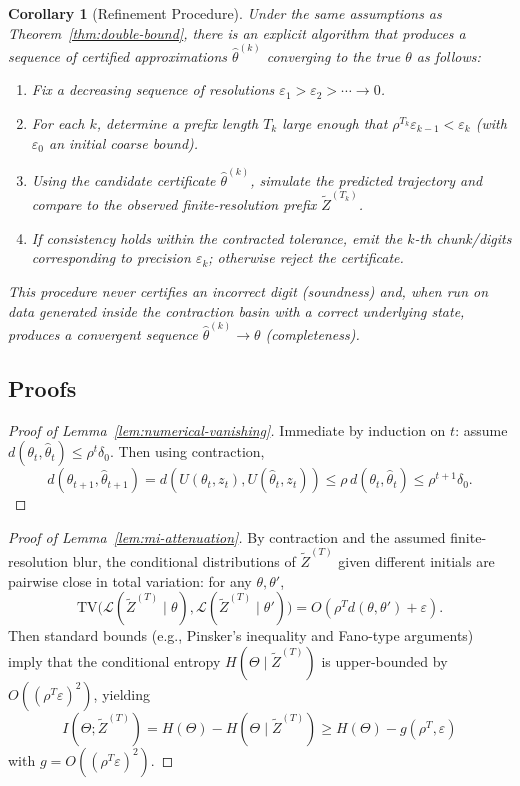 \documentclass[12pt]{article}
\theoremstyle{definition}
\theoremstyle{plain}
\newtheorem{corollary}{Corollary}[section]
\begin{document}
\begin{corollary}[Refinement Procedure]\label{cor:refinement}
Under the same assumptions as Theorem~\ref{thm:double-bound}, there is an explicit algorithm that produces a sequence of certified approximations \(\widehat\theta^{(k)}\) converging to the true \(\theta\) as follows:
\begin{enumerate}
  \item Fix a decreasing sequence of resolutions \(\varepsilon_1>\varepsilon_2>\cdots\to 0\).  
  \item For each \(k\), determine a prefix length \(T_k\) large enough that \(\rho^{T_k}\varepsilon_{k-1} < \varepsilon_k\) (with \(\varepsilon_0\) an initial coarse bound).  
  \item Using the candidate certificate \(\widehat\theta^{(k)}\), simulate the predicted trajectory and compare to the observed finite-resolution prefix \(\widetilde Z^{(T_k)}\).  
  \item If consistency holds within the contracted tolerance, emit the \(k\)-th chunk/digits corresponding to precision \(\varepsilon_k\); otherwise reject the certificate.  
\end{enumerate}
This procedure never certifies an incorrect digit (soundness) and, when run on data generated inside the contraction basin with a correct underlying state, produces a convergent sequence \(\widehat\theta^{(k)} \to \theta\) (completeness).
\end{corollary}

\subsection{Proofs}

\begin{proof}[Proof of Lemma~\ref{lem:numerical-vanishing}]
Immediate by induction on \(t\): assume \(d(\theta_{t},\widehat\theta_{t})\le \rho^t \delta_0\). Then using contraction,
\[
d(\theta_{t+1},\widehat\theta_{t+1}) = d(U(\theta_t,z_t),U(\widehat\theta_t,z_t)) \le \rho\, d(\theta_t,\widehat\theta_t) \le \rho^{t+1} \delta_0.
\]
\end{proof}

\begin{proof}[Proof of Lemma~\ref{lem:mi-attenuation}]
By contraction and the assumed finite-resolution blur, the conditional distributions of \(\widetilde Z^{(T)}\) given different initials are pairwise close in total variation: for any \(\theta,\theta'\),
\[
\mathrm{TV}\bigl(\mathcal{L}(\widetilde Z^{(T)}\mid \theta), \mathcal{L}(\widetilde Z^{(T)}\mid \theta')\bigr)
= O(\rho^T d(\theta,\theta') + \varepsilon).
\]
Then standard bounds (e.g., Pinsker's inequality and Fano-type arguments) imply that the conditional entropy \(H(\Theta \mid \widetilde Z^{(T)})\) is upper-bounded by \(O((\rho^T\varepsilon)^2)\), yielding
\[
I(\Theta;\widetilde Z^{(T)}) = H(\Theta) - H(\Theta\mid \widetilde Z^{(T)}) \ge H(\Theta) - g(\rho^T,\varepsilon)
\]
with \(g=O((\rho^T\varepsilon)^2)\).
\end{proof}
\end{document}
